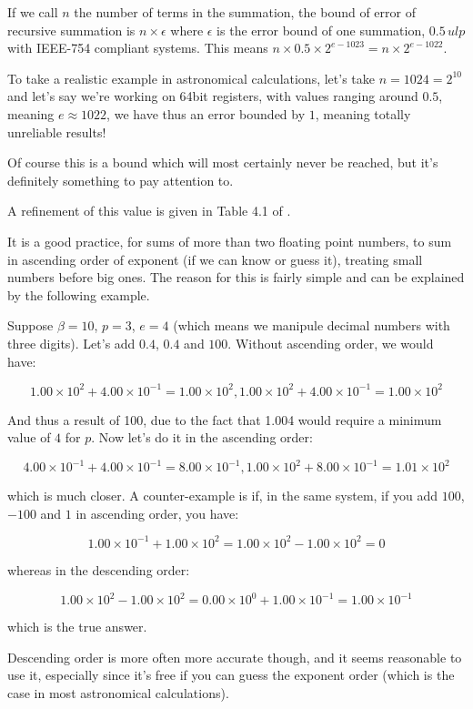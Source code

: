 If we call $n$ the number of terms in the summation, the bound of error of recursive summation is $n\times\epsilon$ where $\epsilon$ is the error bound of one summation, $0.5\,ulp$ with IEEE-754 compliant systems. This means $n\times0.5\times2^{e-1023} = n\times2^{e-1022}$.

To take a realistic example in astronomical calculations, let's take $n=1024=2^{10}$ and let's say we're working on 64bit registers, with values ranging around $0.5$, meaning $e\approx1022$, we have thus an error bounded by $1$, meaning totally unreliable results!

Of course this is a bound which will most certainly never be reached, but it's definitely something to pay attention to.

A refinement of this value is given in Table 4.1 of  \cite{Higham}.

\label{ascendingorder}

It is a good practice, for sums of more than two floating point numbers, to sum in ascending order of exponent (if we can know or guess it), treating small numbers before big ones. The reason for this is fairly simple and can be explained by the following example.

Suppose $\beta=10$, $p=3$, $e=4$ (which means we manipule decimal numbers with three digits). Let's add $0.4$, $0.4$ and $100$. Without ascending order, we would have:

$$1.00\times 10^2 + 4.00\times 10^{-1} = 1.00\times 10^2, 1.00\times 10^2 + 4.00\times 10^{-1} = 1.00\times 10^2$$

And thus a result of 100, due to the fact that 1.004 would require a minimum value of $4$ for $p$. Now let's do it in the ascending order:

$$4.00\times 10^{-1} + 4.00\times 10^{-1} = 8.00\times 10^{-1}, 1.00\times 10^2 + 8.00 \times 10^{-1} = 1.01\times 10^2$$

which is much closer. A counter-example is if, in the same system, if you add $100$, $-100$ and $1$ in ascending order, you have:

$$1.00\times 10^{-1} + 1.00\times 10^{2} = 1.00\times 10^{2} - 1.00\times 10^{2} = 0$$

whereas in the descending order:

$$1.00\times 10^{2} - 1.00\times 10^{2} = 0.00\times 10^{0} + 1.00\times 10^{-1} = 1.00\times 10^{-1}$$

which is the true answer.

Descending order is more often more accurate though, and it seems reasonable to use it, especially since it's free if you can guess the exponent order (which is the case in most astronomical calculations).

